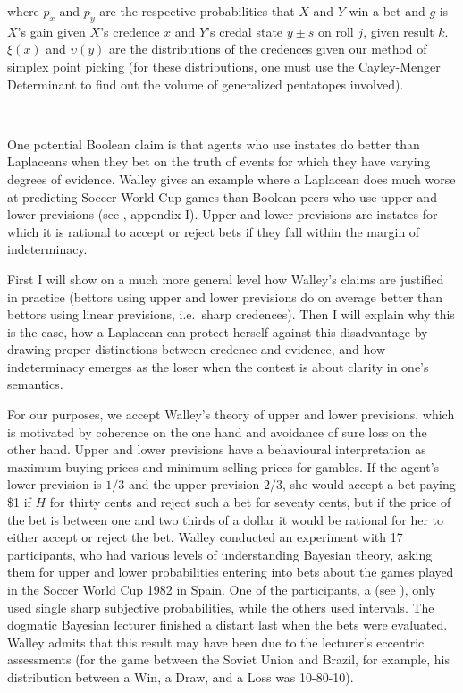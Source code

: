 \documentclass[11pt]{article}
\begin{document}
where $p_{x}$ and $p_{y}$ are the respective probabilities that $X$
and $Y$ win a bet and $g$ is $X$'s gain given $X$'s credence $x$ and
$Y$'s credal state $y\pm{}s$ on roll $j$, given result $k$. $\xi(x)$
and $\upsilon(y)$ are the distributions of the credences given our
method of simplex point picking (for these distributions, one must use
the Cayley-Menger Determinant to find out the volume of generalized
pentatopes involved).

^^^

One potential Boolean claim is that agents who use instates do better
than Laplaceans when they bet on the truth of events for which they
have varying degrees of evidence. Walley gives an example where a
Laplacean does much worse at predicting Soccer World Cup games than
Boolean peers who use upper and lower previsions (see
, appendix I). Upper and lower previsions are
instates for which it is rational to accept or reject bets if they
fall within the margin of indeterminacy.

First I will show on a much more general level how Walley's claims are
justified in practice (bettors using upper and lower previsions do on
average better than bettors using linear previsions, i.e.\ sharp
credences). Then I will explain why this is the case, how a Laplacean
can protect herself against this disadvantage by drawing proper
distinctions between credence and evidence, and how indeterminacy
emerges as the loser when the contest is about clarity in one's
semantics.

For our purposes, we accept Walley's theory of upper and lower
previsions, which is motivated by coherence on the one hand and
avoidance of sure loss on the other hand. Upper and lower previsions
have a behavioural interpretation as maximum buying prices and minimum
selling prices for gambles. If the agent's lower prevision is $1/3$
and the upper prevision $2/3$, she would accept a bet paying \$1 if
$H$ for thirty cents and reject such a bet for seventy cents, but if
the price of the bet is between one and two thirds of a dollar it
would be rational for her to either accept or reject the bet. Walley
conducted an experiment with 17 participants, who had various levels
of understanding Bayesian theory, asking them for upper and lower
probabilities entering into bets about the games played in the Soccer
World Cup 1982 in Spain. One of the participants, a  (see ), only used single
sharp subjective probabilities, while the others used intervals. The
dogmatic Bayesian lecturer finished a distant last when the bets were
evaluated. Walley admits that this result may have been due to the
lecturer's eccentric assessments (for the game between the Soviet
Union and Brazil, for example, his distribution between a Win, a Draw,
and a Loss was 10-80-10).
\end{document}
